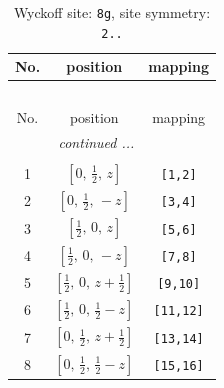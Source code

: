 \documentclass[fleqn,8pt]{jsarticle}
\begin{document}
\renewcommand{\arraystretch}{1.2}
\begin{longtable}{ccc}
\caption{Wyckoff site: {\tt 8g}, site symmetry: {\tt 2..}}
 \\
 \hline \hline
No. & position & mapping \\ \hline \endfirsthead

\multicolumn{2}{l}{\tablename\ \thetable{}} \\
 \hline \hline
No. & position & mapping \\ \hline \endhead

 \hline \hline
\multicolumn{2}{r}{\footnotesize\it continued ...} \\ \endfoot

 \hline \hline
\multicolumn{2}{r}{} \\ \endlastfoot

1 & $\left[ 0,\, \frac{1}{2},\, z \right]$ & {\tt [1,2]} \\ \hline
2 & $\left[ 0,\, \frac{1}{2},\, - z \right]$ & {\tt [3,4]} \\ \hline
3 & $\left[ \frac{1}{2},\, 0,\, z \right]$ & {\tt [5,6]} \\ \hline
4 & $\left[ \frac{1}{2},\, 0,\, - z \right]$ & {\tt [7,8]} \\ \hline
5 & $\left[ \frac{1}{2},\, 0,\, z + \frac{1}{2} \right]$ & {\tt [9,10]} \\ \hline
6 & $\left[ \frac{1}{2},\, 0,\, \frac{1}{2} - z \right]$ & {\tt [11,12]} \\ \hline
7 & $\left[ 0,\, \frac{1}{2},\, z + \frac{1}{2} \right]$ & {\tt [13,14]} \\ \hline
8 & $\left[ 0,\, \frac{1}{2},\, \frac{1}{2} - z \right]$ & {\tt [15,16]} \\
\end{longtable}
\renewcommand{\arraystretch}{1.2}
\end{document}

